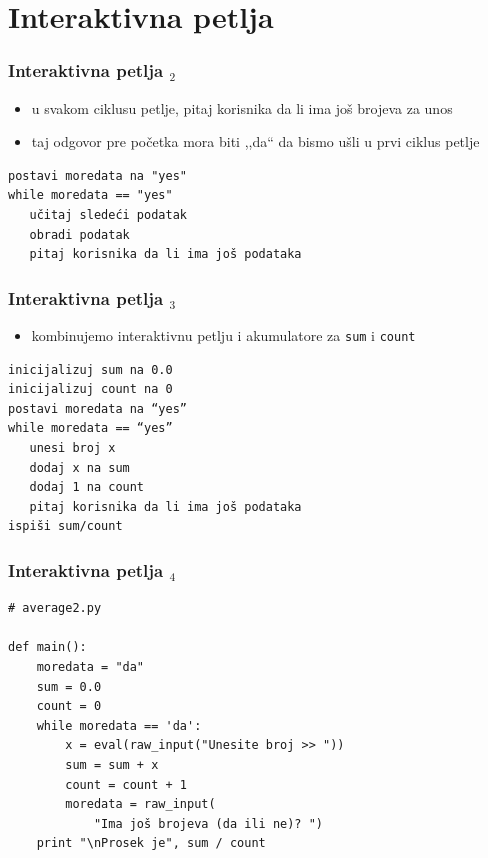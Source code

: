 \documentclass[utf8,compress]{beamer}
\begin{document}
\section{Interaktivna petlja}


\begin{frame}[fragile]
  \frametitle{Interaktivna petlja $_2$}
  \begin{itemize}
    \item u svakom ciklusu petlje, pitaj korisnika da li ima još brojeva za unos
    \item taj odgovor pre početka mora biti ,,da`` da bismo ušli u prvi ciklus petlje
  \end{itemize}
\begin{verbatim}
postavi moredata na "yes"
while moredata == "yes"
   učitaj sledeći podatak
   obradi podatak
   pitaj korisnika da li ima još podataka
\end{verbatim}
\end{frame}

\begin{frame}[fragile]
  \frametitle{Interaktivna petlja $_3$}
  \begin{itemize}
    \item kombinujemo interaktivnu petlju i akumulatore za \texttt{sum} i \texttt{count}
  \end{itemize}
\begin{verbatim}
inicijalizuj sum na 0.0
inicijalizuj count na 0
postavi moredata na “yes”
while moredata == “yes”
   unesi broj x
   dodaj x na sum
   dodaj 1 na count
   pitaj korisnika da li ima još podataka
ispiši sum/count
\end{verbatim}
\end{frame}

\begin{frame}[fragile]
  \frametitle{Interaktivna petlja $_4$}
\begin{verbatim}
# average2.py

def main():
    moredata = "da"
    sum = 0.0
    count = 0
    while moredata == 'da':
        x = eval(raw_input("Unesite broj >> "))
        sum = sum + x
        count = count + 1
        moredata = raw_input(
            "Ima još brojeva (da ili ne)? ")
    print "\nProsek je", sum / count
\end{verbatim}
\end{frame}
\end{document}

